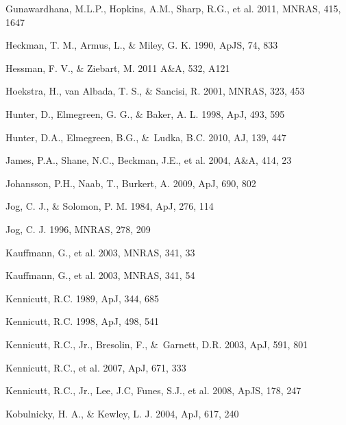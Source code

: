 \documentclass[12pt,preprint]{aastex}
\begin{document}
\begin{thebibliography}{}

         Gunawardhana, M.L.P., Hopkins, A.M., Sharp, R.G., et
         al. 2011, MNRAS, 415, 1647 

 Heckman, T. M., Armus, L., \& Miley, G. K. 1990, ApJS, 74, 833

 Hessman, F. V., \& Ziebart, M. 2011 A\&A, 532, A121

 Hoekstra, H., van Albada, T. S., \& Sancisi, R. 2001, MNRAS, 323, 453

 Hunter, D., Elmegreen, G. G., \& Baker, A. L. 1998, ApJ, 493, 595

         Hunter, D.A., Elmegreen, B.G., \&\ Ludka, B.C. 2010, AJ, 139,
         447 

         James, P.A., Shane, N.C., Beckman, J.E., et al. 2004, A{\&}A,
         414, 23

         Johansson, P.H., Naab, T., Burkert, A. 2009, ApJ, 690, 802

 Jog, C. J., \& Solomon, P. M. 1984, ApJ, 276, 114

 Jog, C. J. 1996, MNRAS, 278, 209

 Kauffmann, G., et al. 2003, MNRAS, 341, 33

 Kauffmann, G., et al. 2003, MNRAS, 341, 54

 Kennicutt, R.C. 1989, ApJ, 344, 685

 Kennicutt, R.C. 1998, ApJ, 498, 541

         Kennicutt, R.C., Jr., Bresolin, F., \&\ Garnett, D.R. 2003,
         ApJ, 591, 801

 Kennicutt, R.C., et al. 2007, ApJ, 671, 333

         Kennicutt, R.C., Jr., Lee, J.C, Funes, S.J., et al. 2008,
         ApJS, 178, 247

 Kobulnicky, H. A., \& Kewley, L. J. 2004, ApJ, 617, 240



\end{thebibliography}
\end{document}
